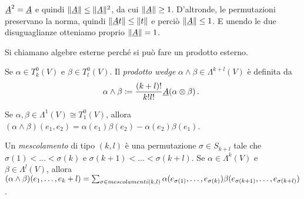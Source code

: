 \begin{remark}
	$\antisimm^2=\antisimm$ e quindi $\norm\antisimm \le \norm\antisimm^2$, da cui $\norm\antisimm \ge 1 $. %
	D'altronde, le permutazioni preservano la norma, quindi $\norm{\antisimm t} \le \norm{t}$ e perciò $\norm \antisimm \le 1$.
	E unendo le due disuguaglianze otteniamo proprio $\norm\antisimm = 1$.
\end{remark}

Si chiamano algebre esterne perché si può fare un prodotto esterno.

\begin{definition}
	Se $\alpha \in T^0_k(V)$ e $\beta \in T^0_l(V)$. Il \emph{prodotto wedge} $\alpha \wedge \beta \in \Lambda^{k+l}(V)$ è definita da
	\begin{equation*}
		\alpha\wedge \beta \coloneqq \frac {(k+l)!}{k!l!} \antisimm(\alpha\otimes \beta)\punto
	\end{equation*}
\end{definition}

\begin{example}
	Se $\alpha,\beta\in\Lambda^1(V) \cong T^0_1(V)$, allora $(\alpha\wedge \beta)(e_1,e_2) = \alpha(e_1)\beta(e_2) - \alpha(e_2)\beta(e_1)$.
\end{example}

\begin{exercise}
	Un \emph{mescolamento} di tipo $(k,l)$ è una permutazione $\sigma \in S_{k+l}$ tale che $\sigma(1) < \ldots < \sigma(k)$ e $\sigma(k+1) <\ldots < \sigma(k+l)$.
	Se $\alpha\in\Lambda^k(V)$ e $\beta\in\Lambda^l(V)$, allora $(\alpha\wedge\beta)(\seqb{e}{k+l}{,}) = \sum_{\sigma \in mescolamenti(k,l)} \alpha(e_{\sigma(1)},\ldots,e_{\sigma(k)}) \beta(e_{\sigma(k+1)},\ldots,e_{\sigma(k+l)})$.
\end{exercise}

